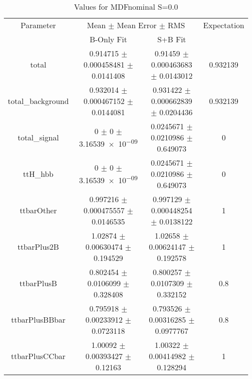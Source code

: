 \begin{table}
\centering
\caption{Values for MDFnominal S=0.0}
\begin{tabular}{cccc}
\toprule
Parameter & \multicolumn{2}{c}{Mean $\pm$ Mean Error $\pm$ RMS} & Expectation\\
 & B-Only Fit & S+B Fit & \\
\midrule
total & \num{0.914715} $\pm$ \num{0.000458481} $\pm$ \num{0.0141408} & \num{0.91459} $\pm$ \num{0.000463683} $\pm$ \num{0.0143012} & \num{0.932139}\\
total\_background & \num{0.932014} $\pm$ \num{0.000467152} $\pm$ \num{0.0144081} & \num{0.931422} $\pm$ \num{0.000662839} $\pm$ \num{0.0204436} & \num{0.932139}\\
total\_signal & \num{0} $\pm$ \num{0} $\pm$ \num{3.16539e-09} & \num{0.0245671} $\pm$ \num{0.0210986} $\pm$ \num{0.649073} & \num{0}\\
ttH\_hbb & \num{0} $\pm$ \num{0} $\pm$ \num{3.16539e-09} & \num{0.0245671} $\pm$ \num{0.0210986} $\pm$ \num{0.649073} & \num{0}\\
ttbarOther & \num{0.997216} $\pm$ \num{0.000475557} $\pm$ \num{0.0146535} & \num{0.997129} $\pm$ \num{0.000448254} $\pm$ \num{0.0138122} & \num{1}\\
ttbarPlus2B & \num{1.02874} $\pm$ \num{0.00630474} $\pm$ \num{0.194529} & \num{1.02658} $\pm$ \num{0.00624147} $\pm$ \num{0.192578} & \num{1}\\
ttbarPlusB & \num{0.802454} $\pm$ \num{0.0106099} $\pm$ \num{0.328408} & \num{0.800257} $\pm$ \num{0.0107309} $\pm$ \num{0.332152} & \num{0.8}\\
ttbarPlusBBbar & \num{0.795918} $\pm$ \num{0.00233912} $\pm$ \num{0.0723118} & \num{0.793526} $\pm$ \num{0.00316285} $\pm$ \num{0.0977767} & \num{0.8}\\
ttbarPlusCCbar & \num{1.00092} $\pm$ \num{0.00393427} $\pm$ \num{0.12163} & \num{1.00322} $\pm$ \num{0.00414982} $\pm$ \num{0.128294} & \num{1}\\
\bottomrule
\end{tabular}
\end{table}